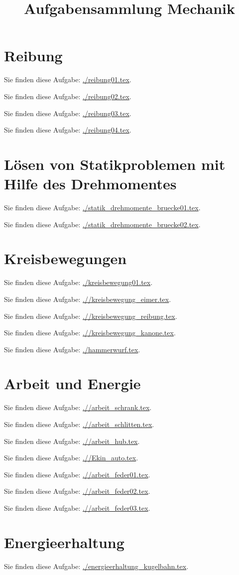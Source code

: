\documentclass[12pt,a4paper,twoside]{article}
\title{Aufgabensammlung Mechanik}
\date{}
\def\dir{./}
\newcommand{\Einbinden}[1]{\par Sie finden diese Aufgabe: \url{#1}.\par}
\begin{document}
\maketitle

\section{Reibung}
\Einbinden{./reibung01.tex}
\Einbinden{./reibung02.tex}
\Einbinden{./reibung03.tex}
\Einbinden{./reibung04.tex}


\section{Lösen von Statikproblemen mit Hilfe des Drehmomentes}
\Einbinden{./statik_drehmomente_bruecke01.tex}
\newpage
\Einbinden{./statik_drehmomente_bruecke02.tex}






\newpage
\section{Kreisbewegungen}
\Einbinden{./kreisbewegung01.tex}\newpage
\Einbinden{\dir/kreisbewegung_eimer.tex}\newpage
\Einbinden{\dir/kreisbewegung_reibung.tex}\newpage
\Einbinden{\dir/kreisbewegung_kanone.tex}
\Einbinden{./hammerwurf.tex}\newpage

\section{Arbeit und Energie}
\Einbinden{\dir/arbeit_schrank.tex}\newpage
\Einbinden{\dir/arbeit_schlitten.tex}\newpage
\Einbinden{\dir/arbeit_hub.tex}\newpage
\Einbinden{\dir/Ekin_auto.tex}\newpage
\Einbinden{\dir/arbeit_feder01.tex}\newpage
\Einbinden{\dir/arbeit_feder02.tex}\newpage
\Einbinden{\dir/arbeit_feder03.tex}\newpage


\section{Energieerhaltung}
\Einbinden{./energieerhaltung_kugelbahn.tex}


\newpage
{}
\end{document}
